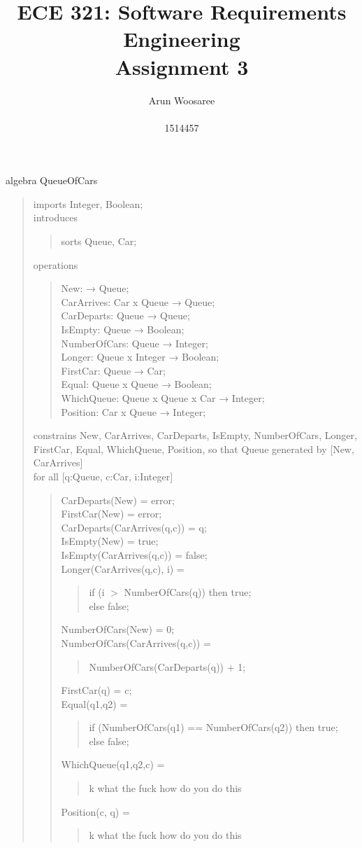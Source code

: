 \documentclass[letterpaper,12pt]{article}
\title{ECE 321: Software Requirements Engineering \\ Assignment 3}
\author{Arun Woosaree \\ \\ 1514457}
\begin{document}
\maketitle

algebra QueueOfCars
\begin{quote}
 imports Integer, Boolean;\\
 introduces
 \begin{quote}
  sorts Queue, Car;
 \end{quote}
 operations
 \begin{quote}
  New: → Queue;\\
  CarArrives: Car x Queue → Queue;\\
  CarDeparts: Queue → Queue;\\
  IsEmpty: Queue → Boolean;\\
  NumberOfCars: Queue → Integer;\\
  Longer: Queue x Integer → Boolean;\\
  FirstCar: Queue → Car;\\
  Equal: Queue x Queue → Boolean;\\
  WhichQueue: Queue x Queue x Car → Integer;\\
  Position: Car x Queue → Integer;
 \end{quote}
 constrains New, CarArrives, CarDeparts, IsEmpty, NumberOfCars, Longer, FirstCar, Equal, WhichQueue, Position, so that Queue generated by [New, CarArrives]\\
 
 for all [q:Queue, c:Car, i:Integer]
 \begin{quote}
  CarDeparts(New) = error;\\
  FirstCar(New) = error;\\
  CarDeparts(CarArrives(q,c)) = q;\\
  IsEmpty(New) = true;\\
  IsEmpty(CarArrives(q,c)) = false;\\
  Longer(CarArrives(q,c), i) =
  \begin{quote}
   if (i $>$ NumberOfCars(q)) then true;\\
   else false;
  \end{quote}
  NumberOfCars(New) = 0;\\
  NumberOfCars(CarArrives(q,c)) =
  \begin{quote}
   NumberOfCars(CarDeparts(q)) + 1;
  \end{quote}
  FirstCar(q) = c;\\
  Equal(q1,q2) =
  \begin{quote}
   if (NumberOfCars(q1) == NumberOfCars(q2)) then true;\\
   else false;
  \end{quote}
  WhichQueue(q1,q2,c) =
  \begin{quote}
   k what the fuck how do you do this
  \end{quote}
  Position(c, q) =
  \begin{quote}
   k what the fuck how do you do this
  \end{quote}
  
 \end{quote}
 
\end{quote}
\end{document}
